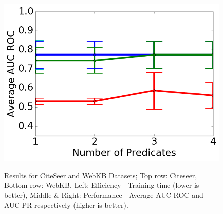 \documentclass[sigconf]{acmart}
\begin{document}
\begin{figure}[t]
{\includegraphics[width = 0.33\linewidth]{images/WebKBAverageAUCROC.png}
\label{fig:webkbROC}
}%
%
\\
%
\caption{Results for CiteSeer and WebKB Datasets; Top row: Citeseer, Bottom row: WebKB. Left: Efficiency - Training time (lower is better), Middle \& Right: Performance - Average AUC ROC and AUC PR respectively (higher is better).}
\label{fig:results1}
\end{figure}
\end{document}
